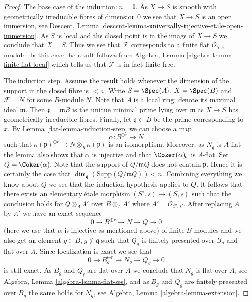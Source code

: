\begin{proof}
\medskip\noindent
The base case of the induction: $n = 0$.
As $X \to S$ is smooth with geometrically
irreducible fibres of dimension $0$ we see that $X \to S$ is an open
immersion, see
Descent, Lemma \ref{descent-lemma-universally-injective-etale-open-immersion}.
As $S$ is local and the closed point is in the image of $X \to S$
we conclude that $X = S$. Thus we see that $\mathcal{F}$ corresponds
to a finite flat $\mathcal{O}_{S, s}$ module. In this case the result
follows from
Algebra, Lemma \ref{algebra-lemma-finite-flat-local}
which tells us that $\mathcal{F}$ is in fact finite free.

\medskip\noindent
The induction step. Assume the result holds whenever the dimension
of the support in the closed fibre is $< n$. Write $S = \Spec(A)$,
$X = \Spec(B)$ and $\mathcal{F} = \widetilde{N}$ for some $B$-module
$N$. Note that $A$ is a local ring; denote its maximal ideal $\mathfrak m$.
Then $\mathfrak p = \mathfrak mB$ is the unique minimal prime lying over
$\mathfrak m$ as $X \to S$ has geometrically irreducible fibres. Finally,
let $\mathfrak q \subset B$ be the prime corresponding to $x$. By
Lemma \ref{flat-lemma-induction-step}
we can choose a map
$$
\alpha : B^{\oplus r} \to N
$$
such that $\kappa(\mathfrak p)^{\oplus r} \to N \otimes_B \kappa(\mathfrak p)$
is an isomorphism. Moreover, as $N_{\mathfrak q}$ is $A$-flat the lemma
also shows that $\alpha$ is injective and that
$\Coker(\alpha)_{\mathfrak q}$ is $A$-flat.
Set $Q = \Coker(\alpha)$. Note that the support of $Q/\mathfrak mQ$
does not contain $\mathfrak p$. Hence it is certainly the case that
$\dim_{\mathfrak q}(\text{Supp}(Q/\mathfrak mQ)) < n$.
Combining everything we know about $Q$ we see
that the induction hypothesis applies to $Q$. It follows that there exists
an elementary \'etale morphism $(S', s) \to (S, s)$ such that the conclusion
holds for $Q \otimes_A A'$ over $B \otimes_A A'$ where
$A' = \mathcal{O}_{S', s'}$. After replacing $A$ by $A'$ we have an
exact sequence
$$
0 \to B^{\oplus r} \to N \to Q \to 0
$$
(here we use that $\alpha$ is injective as mentioned above)
of finite $B$-modules and we also get an element
$g \in B$, $g \not \in \mathfrak q$ such that
$Q_g$ is finitely presented over $B_g$ and flat over $A$. Since localization
is exact we see that
$$
0 \to B_g^{\oplus r} \to N_g \to Q_g \to 0
$$
is still exact. As $B_g$ and $Q_g$ are flat over $A$ we conclude that
$N_g$ is flat over $A$, see
Algebra, Lemma \ref{algebra-lemma-flat-ses},
and as $B_g$ and $Q_g$ are finitely presented over $B_g$ the same holds
for $N_g$, see
Algebra, Lemma \ref{algebra-lemma-extension}.
\end{proof}

